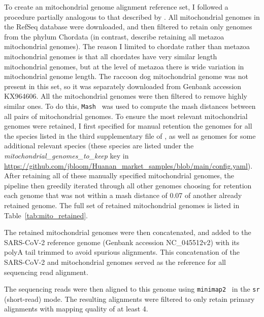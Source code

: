 \documentclass[9pt,twocolumn,twoside]{gsajnl_modified}
\begin{document}
{To create an mitochondrial genome alignment reference set, I followed a procedure partially analogous to that described by \citet{crits2023genetic}.
All mitochondrial genomes in the RefSeq database were downloaded, and then filtered to retain only genomes from the phylum Chordata (in contrast, \citet{crits2023genetic} describe retaining all metazoa mitochondrial genomes).
The reason I limited to chordate rather than metazoa mitochondrial genomes is that all chordates have very similar length mitochondrial genomes, but at the level of metazoa there is wide variation in mitochondrial genome length.
The raccoon dog mitochondrial genome was not present in this set, so it was separately downloaded from Genbank accession KX964606.
All the mitochondrial genomes were then filtered to remove highly similar ones.
To do this, \texttt{Mash}~\citep{ondov2016mash} was used to compute the mash distances between all pairs of mitochondrial genomes.
To ensure the most relevant mitochondrial genomes were retained, I first specified for manual retention the genomes for all the species listed in the third supplementary file of \citet{crits2023genetic}, as well as genomes for some additional relevant species (these species are listed under the \textit{mitochondrial\_genomes\_to\_keep} key in \url{https://github.com/jbloom/Huanan_market_samples/blob/main/config.yaml}).
After retaining all of these manually specified mitochondrial genomes, the pipeline then greedily iterated through all other genomes choosing for retention each genome that was not within a mash distance of 0.07 of another already retained genome.
The full set of retained mitochondrial genomes is listed in Table~\ref{tab:mito_retained}.

The retained mitochondrial genomes were then concatenated, and added to the SARS-CoV-2 reference genome (Genbank accession NC\_045512v2) with its polyA tail trimmed to avoid spurious alignments.
This concatenation of the SARS-CoV-2 and mitochondrial genomes served as the reference for all sequencing read alignment.

The sequencing reads were then aligned to this genome using \texttt{minimap2}~\citep{li2018minimap2} in the \texttt{sr} (short-read) mode.
The resulting alignments were filtered to only retain primary alignments with mapping quality of at least 4.

}
\end{document}
